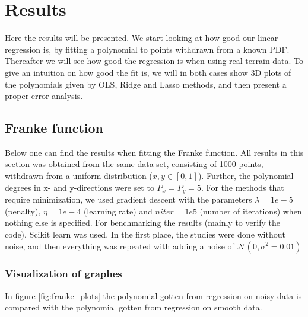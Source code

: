 \section{Results} \label{sec:results}
Here the results will be presented. We start looking at how good our linear regression is, by fitting a polynomial to points withdrawn from a known PDF. Thereafter we will see how good the regression is when using real terrain data. To give an intuition on how good the fit is, we will in both cases show 3D plots of the polynomials given by OLS, Ridge and Lasso methods, and then present a proper error analysis. 

\subsection{Franke function}
Below one can find the results when fitting the Franke function. All results in this section was obtained from the same data set, consisting of 1000 points, withdrawn from a uniform distribution ($x,y\in[0,1]$). Further, the polynomial degrees in x- and y-directions were set to $P_x=P_y=5$. For the methods that require minimization, we used gradient descent with the parameters $\lambda=1e-5$ (penalty), $\eta=1e-4$ (learning rate) and $niter=1e5$ (number of iterations) when nothing else is specified. For benchmarking the results (mainly to verify the code), Scikit learn was used. In the first place, the studies were done without noise, and then everything was repeated with adding a noise of $\mathcal{N}(0, \sigma^2=0.01)$

\subsubsection{Visualization of graphes}
In figure \eqref{fig:franke_plots} the polynomial gotten from regression on noisy data is compared with the polynomial gotten from regression on smooth data. 

